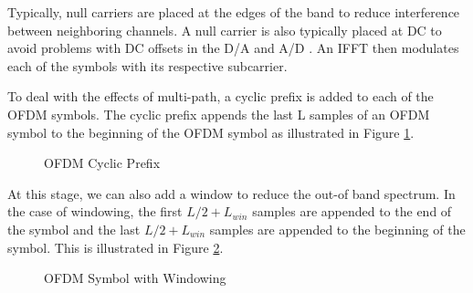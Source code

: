 \documentclass[conference]{IEEEtran}
\begin{document}
		Typically, null carriers are placed at the edges of the band to reduce interference between neighboring channels. A null carrier is also typically placed at DC to avoid problems with DC offsets in the D/A and A/D \cite{802_11a_standard}. An IFFT then modulates each of the symbols with its respective subcarrier.
		
		To deal with the effects of multi-path, a cyclic prefix is added to each of the OFDM symbols. The cyclic prefix appends the last L samples of an OFDM symbol to the beginning of the OFDM symbol as illustrated in Figure \ref{fig::cylic_prefix}.
		
		\begin{figure}[H]
	    		\centering
	    		\caption{OFDM Cyclic Prefix \cite{djordjevic-2017}}
	    		\label{fig::cylic_prefix}
		\end{figure}
		
		At this stage, we can also add a window to reduce the out-of band spectrum. In the case of windowing, the first \newline $L/2 + L_{win}$ samples are appended to the end of the symbol and the last $L/2 + L_{win}$ samples are appended to the beginning of the symbol. This is illustrated in Figure \ref{fig::ofdm_windowing}.
		
		\begin{figure}[H]
	    		\centering
	    		\caption{OFDM Symbol with Windowing \cite{djordjevic-2017}}
	    		\label{fig::ofdm_windowing}
		\end{figure}
		
\end{document}
